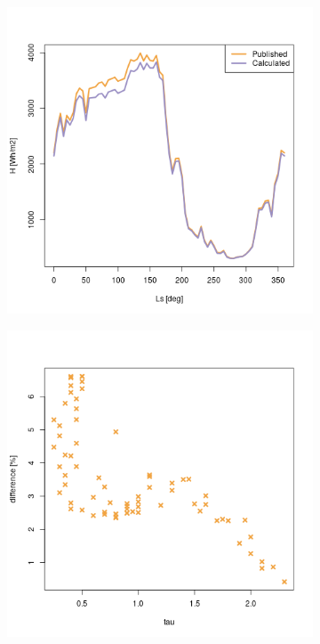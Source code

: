 \begin{figure}[H]
\captionsetup[subfigure]{justification=centering}
\vspace{-2ex}
\centering
    \setlength{\subfigureWidth}{0.50\textwidth}
    \setlength{\graphicsHeight}{80mm}
    \hypersetup{hidelinks=true}%
    \begin{subfigure}[t]{\subfigureWidth}
        \centering
            \includegraphics[height=\graphicsHeight]{sections/appendix/A/plots/h-exp-calc-at-vl2-with-beta-477-deg.png}
            \label{fig:sub:comparative-global-insolation-at-vl2-beta-equals-phi-daily-variations}
    \end{subfigure}\hfill
    \begin{subfigure}[t]{\subfigureWidth}
        \centering
            \includegraphics[height=\graphicsHeight]{sections/appendix/A/plots/h-diff-bet-exp-calc-at-vl2-with-beta-477-deg.png}

\end{subfigure}
\end{figure}
